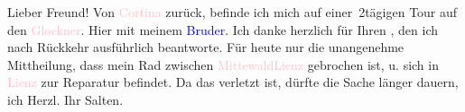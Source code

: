 \pstart
           Lieber Freund! Von \textcolor{pink}{Cortina}{}\ledrightnote{\textcolor{pink}{Cortina d'Ampezzo}} zurück, befinde ich mich auf einer 2tägigen Tour auf den \textcolor{pink}{Glockner}{}\ledrightnote{\textcolor{pink}{Großglockner}}. Hier mit meinem \textcolor{blue}{Bruder}{}\ledrightnote{{$\rightarrow$}\textcolor{blue}{Michael Emil Salzmann}}. Ich danke herzlich
               für Ihren \label{K_L03125-1v}\label{K_L03125-1h}, den ich nach Rückkehr ausführlich beantworte. Für heute nur die unangenehme Mittheilung, dass mein Rad
               zwischen \textcolor{pink}{Mittewald}{}\ledrightnote{\textcolor{pink}{Mittewald an der Drau}}{ }{\kaufmannsund}{ }\textcolor{pink}{Lienz}{}\ledrightnote{\textcolor{pink}{Lienz}} gebrochen ist, u. sich in \textcolor{pink}{Lienz}{}\ledrightnote{\textcolor{pink}{Lienz}} zur Reparatur befindet. Da das \label{K_L03125-2v}\label{K_L03125-2h} verletzt ist, dürfte die Sache länger dauern, ich \label{K_L03125-3v}\label{K_L03125-3h}\pend
           \pstart Herzl. Ihr \spacefill\mbox{Salten.}\pend{}\endnumbering{}  
      